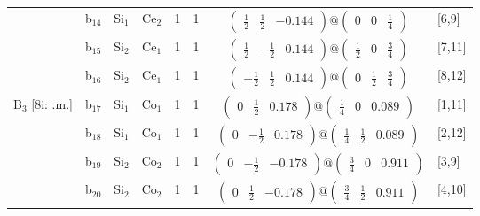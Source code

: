 \documentclass[fleqn,10pt,landscape]{article}
\begin{document}
\begin{itemize}
\begin{center}
\begin{longtable}{cc|cc|c|c|c|l}
& b$_{14}$ & Si$_{1}$ & Ce$_{2}$ & 1 & 1 & $\begin{pmatrix} \frac{1}{2} & \frac{1}{2} & -0.144 \end{pmatrix}@\begin{pmatrix} 0 & 0 & \frac{1}{4} \end{pmatrix}$ & [6,9] \\
& b$_{15}$ & Si$_{2}$ & Ce$_{1}$ & 1 & 1 & $\begin{pmatrix} \frac{1}{2} & - \frac{1}{2} & 0.144 \end{pmatrix}@\begin{pmatrix} \frac{1}{2} & 0 & \frac{3}{4} \end{pmatrix}$ & [7,11] \\
& b$_{16}$ & Si$_{2}$ & Ce$_{1}$ & 1 & 1 & $\begin{pmatrix} - \frac{1}{2} & \frac{1}{2} & 0.144 \end{pmatrix}@\begin{pmatrix} 0 & \frac{1}{2} & \frac{3}{4} \end{pmatrix}$ & [8,12] \\ \hline
B$_{3}$ [8i: .m.] & b$_{17}$ & Si$_{1}$ & Co$_{1}$ & 1 & 1 & $\begin{pmatrix} 0 & \frac{1}{2} & 0.178 \end{pmatrix}@\begin{pmatrix} \frac{1}{4} & 0 & 0.089 \end{pmatrix}$ & [1,11] \\
& b$_{18}$ & Si$_{1}$ & Co$_{1}$ & 1 & 1 & $\begin{pmatrix} 0 & - \frac{1}{2} & 0.178 \end{pmatrix}@\begin{pmatrix} \frac{1}{4} & \frac{1}{2} & 0.089 \end{pmatrix}$ & [2,12] \\
& b$_{19}$ & Si$_{2}$ & Co$_{2}$ & 1 & 1 & $\begin{pmatrix} 0 & - \frac{1}{2} & -0.178 \end{pmatrix}@\begin{pmatrix} \frac{3}{4} & 0 & 0.911 \end{pmatrix}$ & [3,9] \\
& b$_{20}$ & Si$_{2}$ & Co$_{2}$ & 1 & 1 & $\begin{pmatrix} 0 & \frac{1}{2} & -0.178 \end{pmatrix}@\begin{pmatrix} \frac{3}{4} & \frac{1}{2} & 0.911 \end{pmatrix}$ & [4,10] \\

\end{longtable}
\end{center}
\end{itemize}
\end{document}

